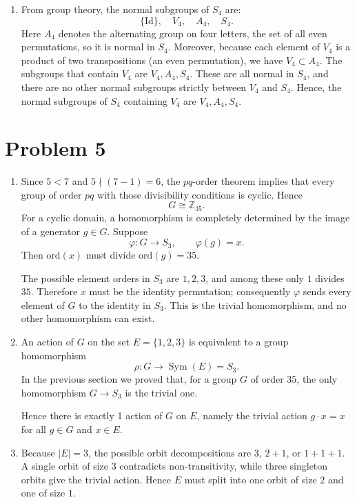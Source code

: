 \documentclass[12pt]{article}
\begin{document}
\begin{enumerate}[label=(\arabic*)]
\begin{enumerate}[label=(\arabic*)]
\item From group theory, the normal subgroups of \( S_4 \) are:
\[
\{ \text{Id} \}, \quad V_4, \quad A_4, \quad S_4.
\]
Here \(A_4\) denotes the alternating group on four letters, the set of all even permutations, so it is normal in \(S_4\). Moreover, because each element of \(V_4\) is a product of two transpositions (an even permutation), we have \(V_4 \subset A_4\).
The subgroups that contain \( V_4 \) are \(V_4, A_4, S_4.\) These are all normal in \( S_4 \), and there are no other normal subgroups strictly between \( V_4 \) and \( S_4 \). 
Hence, the normal subgroups of \( S_4 \) containing \( V_4 \) are \(V_4, A_4, S_4.\) 
\end{enumerate}
\section*{Problem 5}
\begin{enumerate}[label=(\arabic*)] 

\item
Since \(5<7\) and \(5\nmid(7-1)=6\), the $pq$-order theorem implies that every group of order \(pq\) with those divisibility conditions is cyclic.  Hence
\[
G \cong \mathbb Z_{35}.
\]
For a cyclic domain, a homomorphism is completely determined by the image of a generator \(g\in G\).  Suppose
\[
\varphi : G \longrightarrow S_{3},\qquad \varphi(g)=x.
\]
Then \(\mathrm{ord}(x)\) must divide \(\mathrm{ord}(g)=35\).

The possible element orders in \(S_{3}\) are \(1,2,3\), and among these only \(1\) divides \(35\).  Therefore \(x\) must be the identity permutation; consequently \(\varphi\) sends every element of \(G\) to the identity in \(S_{3}\).  This is the trivial homomorphism, and no other homomorphism can exist.

\item

An action of \(G\) on the set \(E=\{1,2,3\}\) is equivalent to a group homomorphism
\[
\rho : G \longrightarrow \operatorname{Sym}(E)=S_{3}.
\]
In the previous section we proved that, for a group \(G\) of order \(35\), the only homomorphism \(G\to S_{3}\) is the trivial one.  

Hence there is exactly 1 action of \(G\) on \(E\), namely the trivial action \(g\cdot x = x\) for all \(g\in G\) and \(x\in E\).

\item
Because \(|E| = 3\), the possible orbit decompositions are
\(3\), \(2+1\), or \(1+1+1\).
A single orbit of size \(3\) contradicts non-transitivity, while
three singleton orbits give the trivial action.
Hence \(E\) must split into one orbit of size \(2\) and one of size \(1\).


\end{enumerate}
\end{enumerate}
\end{document}
